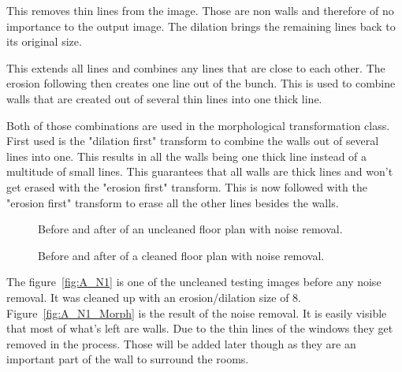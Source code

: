 \begin{description}[style=nextline]
	\item[Erosion first] This removes thin lines from the image. Those are non walls and therefore of no importance to the output image. The dilation brings the remaining lines back to its original size.
	\item[Dilation first] This extends all lines and combines any lines that are close to each other. The erosion following then creates one line out of the bunch. This is used to combine walls that are created out of several thin lines into one thick line.
\end{description}

Both of those combinations are used in the morphological transformation class. First used is the "dilation first" transform to combine the walls out of several lines into one. This results in all the walls being one thick line instead of a multitude of small lines. This guarantees that all walls are thick lines and won't get erased with the "erosion first" transform. This is now followed with the "erosion first" transform to erase all the other lines besides the walls. 

\begin{figure}[h]
	\centering
	\hfill
	\caption{Before and after of an uncleaned floor plan with noise removal. }
\end{figure}

\begin{figure}[h]
	\centering
	\hfill
	\caption{Before and after of a cleaned floor plan with noise removal.}
\end{figure}

The figure~\ref{fig:A_N1} is one of the uncleaned testing images before any noise removal. It was cleaned up with an erosion/dilation size of 8. Figure~\ref{fig:A_N1_Morph} is the result of the noise removal. It is easily visible that most of what's left are walls. Due to the thin lines of the windows they get removed in the process. Those will be added later though as they are an important part of the wall to surround the rooms.

